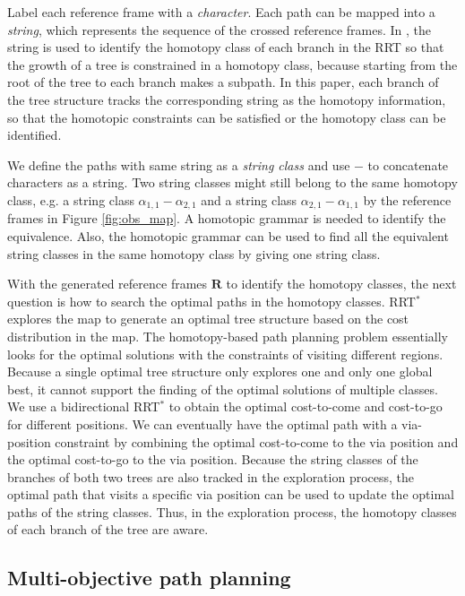 \documentclass[phd]{byuprop}
\begin{document}
Label each reference frame with a \emph{character}.
Each path can be mapped into a {\em string}, which represents the sequence of the crossed reference frames.
In \cite{Hernandez2015}, the string is used to identify the homotopy class of each branch in the RRT so that the growth of a tree is constrained in a homotopy class, because starting from the root of the tree to each branch makes a subpath.
In this paper, each branch of the tree structure tracks the corresponding string as the homotopy information, so that the homotopic constraints can be satisfied or the homotopy class can be identified.

We define the paths with same string as a \emph{string class} and use $ - $ to concatenate characters as a string.
Two string classes might still belong to the same homotopy class, e.g. a string class $ \alpha_{1,1}-\alpha_{2,1} $ and a string class $ \alpha_{2,1}-\alpha_{1,1} $ by the reference frames in Figure \ref{fig:obs_map}.
A homotopic grammar is needed to identify the equivalence.
Also, the homotopic grammar can be used to find all the equivalent string classes in the same homotopy class by giving one string class.

With the generated reference frames $ \mathbf{R} $ to identify the homotopy classes, the next question is how to search the optimal paths in the homotopy classes.
RRT$^{*}$ explores the map to generate an optimal tree structure based on the cost distribution in the map.
The homotopy-based path planning problem essentially looks for the optimal solutions with the constraints of visiting different regions.
Because a single optimal tree structure only explores one and only one global best, it cannot support the finding of the optimal solutions of multiple classes.
We use a bidirectional RRT$^{*}$ to obtain the optimal cost-to-come and cost-to-go for different positions.
We can eventually have the optimal path with a via-position constraint by combining the optimal cost-to-come to the via position and the optimal cost-to-go to the via position.
Because the string classes of the branches of both two trees are also tracked in the exploration process, the optimal path that visits a specific via position can be used to update the optimal paths of the string classes. 
Thus, in the exploration process, the homotopy classes of each branch of the tree are aware.

\subsection{Multi-objective path planning}
\end{document}

